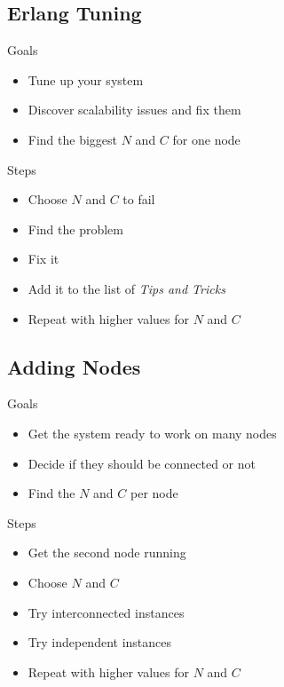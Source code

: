\documentclass[utf8]{beamer}
\begin{document}
\subsection{Erlang Tuning}
\begin{frame}{Goals}
	\begin{itemize}
		\item Tune up \alert{your} system
		\item Discover scalability issues and fix them
		\item Find the biggest $N$ and $C$ for \alert{one node}
	\end{itemize}
\end{frame}
\begin{frame}{Steps}
	\begin{itemize}
		\item Choose $N$ and $C$ to fail
		\item Find the problem
		\item Fix it
		\item Add it to the list of \emph{Tips and Tricks}
		\pause
		\item Repeat with higher values for $N$ and $C$
	\end{itemize}
\end{frame}

\subsection{Adding Nodes}
\begin{frame}{Goals}
	\begin{itemize}
		\item Get the system ready to work on many nodes
		\item Decide if they should be connected or not
		\item Find the $N$ and $C$ \alert{per node}
	\end{itemize}
\end{frame}
\begin{frame}{Steps}
	\begin{itemize}
		\item Get the second node running
		\item Choose $N$ and $C$
		\item Try interconnected instances
		\item Try independent instances
		\pause
		\item Repeat with higher values for $N$ and $C$
	\end{itemize}
\end{frame}
\end{document}
